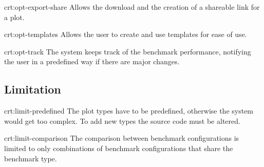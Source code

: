 {crt:opt-export-share}
{Allows the download and the creation of a shareable link for a \gls{plot}.}

{crt:opt-templates}
{Allows the user to create and use \glspl{template} for ease of use.}

{crt:opt-track}
{The system keeps track of the benchmark performance, notifying the user in a predefined way if there are major changes.}


\subsection{Limitation}

{crt:limit-predefined}
{The \gls{plot} types have to be predefined, otherwise the system would get too complex. To add new types the source code must be altered.}

{crt:limit-comparison}
{The comparison between \glspl{benchmark configuration} is limited to only combinations of \glspl{benchmark configuration} that share the benchmark type.}
